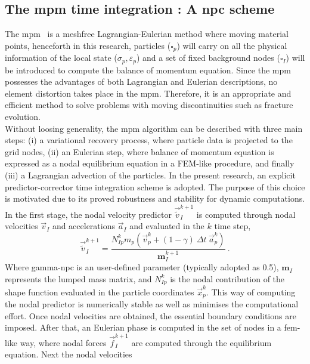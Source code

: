 \message{ !name(2020_EFM_MPM_Eigensoftening.tex)}\documentclass[preprint,12pt,a4paper]{elsarticle}
\newcommand{\tens}[1]{
  \ensuremath{\mathbf{{#1}}}
}
\begin{document}
\subsection{The \acrshort{mpm} time integration : A \acrlong{npc}  scheme}
\label{sec:2.1}
The \acrshort{mpm}~\cite{Sulsky1994} is a meshfree Lagrangian-Eulerian
method where moving material points, henceforth in this research,
particles ($\square_p$) will carry on all the physical information of the local state ($\sigma_p,
\varepsilon_p$) and a set of fixed background nodes ($\square_I$) will
be introduced to compute the balance of momentum equation. Since the
\acrshort{mpm} possesses the advantages of both Lagrangian and
Eulerian descriptions, no element distortion takes place in the
\acrshort{mpm}. Therefore, it is an appropriate and efficient method
to solve problems with moving discontinuities such as fracture evolution.\\
Without loosing generality, the \acrshort{mpm} algorithm
can be described with three main steps: (i) a variational recovery
process, where particle data is projected to the grid nodes, (ii) an
Eulerian step, where balance of momentum equation is expressed as a
nodal equilibrium equation in a FEM-like procedure, and finally
(iii) a Lagrangian advection of the particles. In the present research,
an explicit predictor-corrector time integration scheme is adopted. The
purpose of this choice is motivated due to its proved robustness and
stability for dynamic computations. In the first stage, the nodal
velocity predictor $ \vec{\tilde{v}}_I^{k+1}$ is computed through
nodal velocities $\vec{v}_I$ and accelerations $\vec{a}_I$ and evaluated
in the $k$ time step,
\begin{equation}
  \label{eq:Predictor-velocity}
  \vec{\tilde{v}}_I^{k+1} = \frac{N_{Ip}^{k} m_p (\vec{v}_p^k + (1 - \gamma)\ \Delta t\ \vec{a}_p^k)}{\tens{m}_I^{k+1}}\ .
\end{equation}
Where \gls{gamma-npc} is an user-defined parameter (typically adopted as
0.5), $\tens{m}_I$ represents the lumped mass matrix, and $N_{Ip}^{k}$ is
the nodal contribution of the shape function evaluated in the particle
coordinates $\vec{x}_p^k$. This way of computing the nodal predictor is numerically stable
as well as minimises the computational effort. Once nodal velocities are
obtained, the essential boundary conditions are imposed. After that, an
Eulerian phase is computed in the set of nodes in a
\acrshort{fem}-like way, where nodal forces $\vec{f}_{I}^{k+1}$ are
computed through the equilibrium equation. Next the nodal velocities
\end{document}

